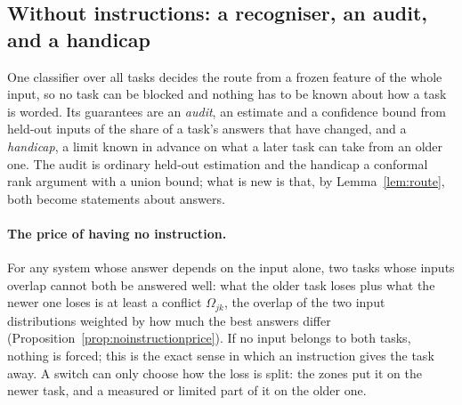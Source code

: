 

\subsection{Without instructions: a recogniser, an audit, and a handicap}
\label{sec:audit}

One classifier over all tasks decides the route from a frozen feature of the whole input, so no
task can be blocked and nothing has to be known about how a task is worded. Its guarantees are
an \emph{audit}, an estimate and a confidence bound from held-out inputs of the share of a task's
answers that have changed, and a \emph{handicap}, a limit known in advance on what a later task
can take from an older one. The audit is ordinary held-out estimation and the handicap a conformal
rank argument with a union bound; what is new is that, by Lemma~\ref{lem:route}, both become
statements about answers.

\paragraph{The price of having no instruction.} For any system whose answer depends on the input alone, two tasks whose inputs overlap
cannot both be answered well: what the older task loses plus what the newer one loses is at least
a conflict $\Omega_{jk}$, the overlap of the two input distributions weighted by how much the best
answers differ (Proposition~\ref{prop:noinstructionprice}). If no input belongs to both tasks,
nothing is forced; this is the exact sense in which an instruction gives the task away. A switch
can only choose how the loss is split: the zones put it on the newer task, \recog{} and
\handicap{} a measured or limited part of it on the older one.

